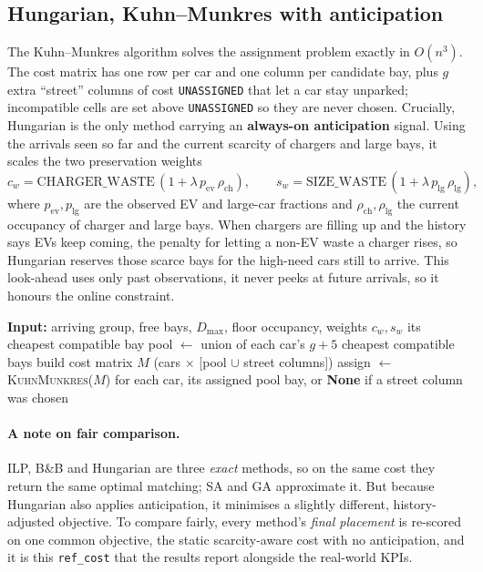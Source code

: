 \documentclass[11pt,a4paper]{article}
\newcommand{\code}[1]{\texttt{\small #1}}
\begin{document}
\subsection{Hungarian, Kuhn--Munkres with anticipation}

The Kuhn--Munkres algorithm solves the assignment problem exactly in $O(n^3)$. The cost
matrix has one row per car and one column per candidate bay, plus $g$ extra ``street''
columns of cost \code{UNASSIGNED} that let a car stay unparked; incompatible cells are
set above \code{UNASSIGNED} so they are never chosen. Crucially, Hungarian is the only
method carrying an \textbf{always-on anticipation} signal. Using the arrivals seen so far
and the current scarcity of chargers and large bays, it scales the two preservation
weights
\begin{equation}
c_w = \mathrm{CHARGER\_WASTE}\,(1+\lambda\,p_{\text{ev}}\,\rho_{\text{ch}}), \qquad
s_w = \mathrm{SIZE\_WASTE}\,(1+\lambda\,p_{\text{lg}}\,\rho_{\text{lg}}),
\end{equation}
where $p_{\text{ev}},p_{\text{lg}}$ are the observed EV and large-car fractions and
$\rho_{\text{ch}},\rho_{\text{lg}}$ the current occupancy of charger and large bays. When
chargers are filling up and the history says EVs keep coming, the penalty for letting a
non-EV waste a charger rises, so Hungarian reserves those scarce bays for the high-need
cars still to arrive. This look-ahead uses only past observations, it never peeks at
future arrivals, so it honours the online constraint.

\begin{algorithm}[h]
\caption{One minute, the Hungarian method}
\label{alg:hungarian}
\begin{algorithmic}[1]
\State \textbf{Input:} arriving group, free bays, $D_{\max}$, floor occupancy, weights $c_w,s_w$
 \Return its cheapest compatible bay \EndIf
\State pool $\gets$ union of each car's $g{+}5$ cheapest compatible bays
\State build cost matrix $M$ (cars $\times$ [pool $\cup$ street columns])
\State assign $\gets$ \textsc{KuhnMunkres}($M$)
\State \Return for each car, its assigned pool bay, or \textbf{None} if a street column was chosen
\end{algorithmic}
\end{algorithm}

\paragraph{A note on fair comparison.} ILP, B\&B and Hungarian are three \emph{exact}
methods, so on the same cost they return the same optimal matching; SA and GA approximate
it. But because Hungarian also applies anticipation, it minimises a slightly different,
history-adjusted objective. To compare fairly, every method's \emph{final placement} is
re-scored on one common objective, the static scarcity-aware cost with no anticipation, and it is this \code{ref\_cost} that the results report alongside the real-world KPIs.
\end{document}
